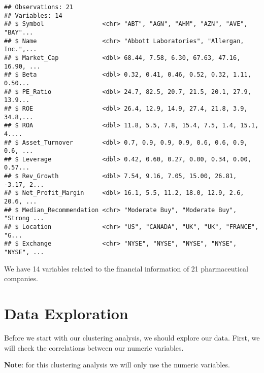 \documentclass[]{article}
\newenvironment{Shaded}{\begin{snugshade}}{\end{snugshade}}
\newcommand{\KeywordTok}[1]{\textcolor[rgb]{0.13,0.29,0.53}{\textbf{#1}}}
\newcommand{\DataTypeTok}[1]{\textcolor[rgb]{0.13,0.29,0.53}{#1}}
\newcommand{\StringTok}[1]{\textcolor[rgb]{0.31,0.60,0.02}{#1}}
\newcommand{\CommentTok}[1]{\textcolor[rgb]{0.56,0.35,0.01}{\textit{#1}}}
\newcommand{\OtherTok}[1]{\textcolor[rgb]{0.56,0.35,0.01}{#1}}
\newcommand{\OperatorTok}[1]{\textcolor[rgb]{0.81,0.36,0.00}{\textbf{#1}}}
\newcommand{\NormalTok}[1]{#1}
\begin{document}
\begin{verbatim}
## Observations: 21
## Variables: 14
## $ Symbol                <chr> "ABT", "AGN", "AHM", "AZN", "AVE", "BAY"...
## $ Name                  <chr> "Abbott Laboratories", "Allergan, Inc.",...
## $ Market_Cap            <dbl> 68.44, 7.58, 6.30, 67.63, 47.16, 16.90, ...
## $ Beta                  <dbl> 0.32, 0.41, 0.46, 0.52, 0.32, 1.11, 0.50...
## $ PE_Ratio              <dbl> 24.7, 82.5, 20.7, 21.5, 20.1, 27.9, 13.9...
## $ ROE                   <dbl> 26.4, 12.9, 14.9, 27.4, 21.8, 3.9, 34.8,...
## $ ROA                   <dbl> 11.8, 5.5, 7.8, 15.4, 7.5, 1.4, 15.1, 4....
## $ Asset_Turnover        <dbl> 0.7, 0.9, 0.9, 0.9, 0.6, 0.6, 0.9, 0.6, ...
## $ Leverage              <dbl> 0.42, 0.60, 0.27, 0.00, 0.34, 0.00, 0.57...
## $ Rev_Growth            <dbl> 7.54, 9.16, 7.05, 15.00, 26.81, -3.17, 2...
## $ Net_Profit_Margin     <dbl> 16.1, 5.5, 11.2, 18.0, 12.9, 2.6, 20.6, ...
## $ Median_Recommendation <chr> "Moderate Buy", "Moderate Buy", "Strong ...
## $ Location              <chr> "US", "CANADA", "UK", "UK", "FRANCE", "G...
## $ Exchange              <chr> "NYSE", "NYSE", "NYSE", "NYSE", "NYSE", ...
\end{verbatim}

We have 14 variables related to the financial information of 21
pharmaceutical companies.

\section{Data Exploration}\label{data-exploration}

Before we start with our clustering analysis, we should explore our
data. First, we will check the correlations between our numeric
variables.

\textbf{Note}: for this clustering analysis we will only use the numeric
variables.

\begin{Shaded}
\end{Shaded}
\end{document}
